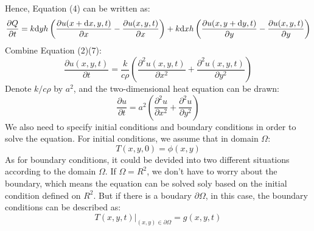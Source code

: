 Hence, Equation (4) can be written as:
\begin{equation}
\frac{\partial Q}{\partial t}=k\mathrm d yh\left(\frac{\partial u(x+\mathrm d x,y,t)}{\partial x}-\frac{\partial u(x,y,t)}{\partial x}\right)+k\mathrm d xh\left(\frac{\partial u(x,y+\mathrm d y,t)}{\partial y}-\frac{\partial u(x,y,t)}{\partial y}\right)
\end{equation}
Combine Equation (2)(7):
\begin{equation}
\frac{\partial u(x,y,t)}{\partial t}=\frac{k}{c\rho}\left(\frac{\partial ^2 u(x,y,t)}{\partial x^2}+\frac{\partial ^2 u(x,y,t)}{\partial y^2}\right)
\end{equation}
Denote $k/c\rho$ by $a^2$, and the two-dimensional heat equation can be drawn:
\begin{equation}
\frac{\partial u}{\partial t}=a^2\left(\frac{\partial ^2 u}{\partial x^2}+\frac{\partial ^2 u}{\partial y^2}\right)
\end{equation}
We also need to specify initial conditions and boundary conditions in order to solve the equation. For initial conditions, we assume that in domain $\Omega$:
\begin{equation}
T(x,y,0)=\phi(x,y) 
\end{equation}
As for boundary conditions, it could be devided into two different situations according to the domain $\Omega$. If $\Omega=R^2$, we don't have to worry about the boundary, which means the equation can be solved soly based on the initial condition defined on $R^2$. But if there is a boudary $\partial\Omega$, in this case, the boundary conditions can be described as: 
\begin{equation}
T(x,y,t)|_{(x,y)\in\partial\Omega} =g(x,y,t) 
\end{equation}
